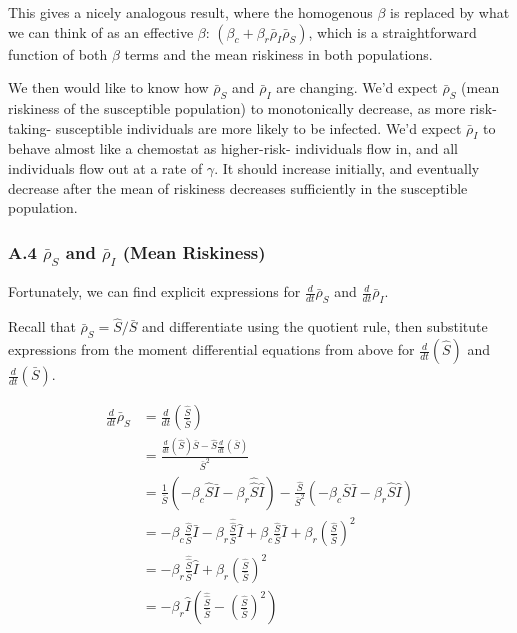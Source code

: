 This gives a nicely analogous result, where the homogenous \(\beta\) is
replaced by what we can think of as an effective \(\beta\):
\((\beta_c + \beta_r \bar \rho_I \bar\rho_S)\), which is a
straightforward function of both \(\beta\) terms and the mean riskiness
in both populations.

We then would like to know how \(\bar\rho_S\) and \(\bar\rho_I\) are
changing. We'd expect \(\bar\rho_S\) (mean riskiness of the susceptible
population) to monotonically decrease, as more risk-taking- susceptible
individuals are more likely to be infected. We'd expect \(\bar\rho_I\)
to behave almost like a chemostat as higher-risk- individuals flow in,
and all individuals flow out at a rate of \(\gamma\). It should increase
initially, and eventually decrease after the mean of riskiness decreases
sufficiently in the susceptible population.

\subsubsection{\texorpdfstring{A.4 \(\bar\rho_S\) and \(\bar\rho_I\)
(Mean
Riskiness)}{A.4 \textbackslash bar\textbackslash rho\_S and \textbackslash bar\textbackslash rho\_I (Mean Riskiness)}}\label{a.4-barrho_s-and-barrho_i-mean-riskiness}

Fortunately, we can find explicit expressions for
\(\frac{d}{dt}\bar\rho_S\) and \(\frac{d}{dt}\bar\rho_I\).

Recall that \(\bar\rho_S = \hat S / \bar S\) and differentiate using the
quotient rule, then substitute expressions from the moment differential
equations from above for \(\frac{d}{dt}( \hat S)\) and
\(\frac{d}{dt}( \bar S )\).

\[
\begin{aligned}
\frac{d}{dt}\bar\rho_S
&= \frac{d}{dt} \left( \frac{\hat S}{\bar S} \right)\\
&= \frac{\frac{d}{dt} (\hat S) \bar S - \hat S \frac{d}{dt}(\bar S)}{\bar S^2}\\
&= \frac{1}{\bar S}\left(
-\beta_c\hat S \bar I - \beta_r \hat{\hat{S}}\hat I
\right)
- \frac{\hat S}{\bar S^2}\left(
-\beta_c \bar S \bar I - \beta_r \hat S \hat I
\right)\\
&= -\beta_c \frac{\hat S}{\bar S} \bar I
- \beta_r \frac{\hat{\hat{S}}}{\bar S}\hat{I}
+ \beta_c \frac{\hat S}{\bar S}\bar I
+ \beta_r \left(\frac{\hat S}{\bar S}\right)^2 \\
&= 
- \beta_r \frac{\hat{\hat{S}}}{\bar S}\hat{I}
+ \beta_r \left(\frac{\hat S}{\bar S}\right)^2 \\
&= -\beta_r \hat I \left(\frac{\hat{ \hat{ S}}}{\bar S} - \left(\frac{\hat S}{\bar S}\right)^2  \right)\\
\end{aligned}
\]

